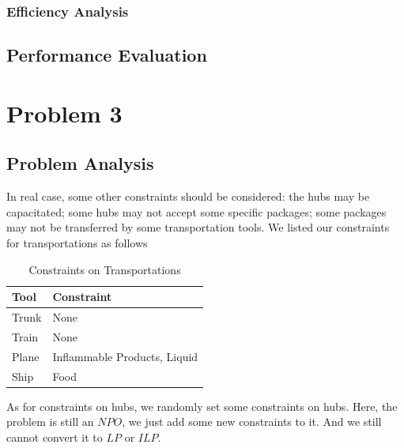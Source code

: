 \documentclass{llncs}
\begin{document}
\subsubsection{Efficiency Analysis}
\subsection{Performance Evaluation}

\section{Problem 3}
\subsection{Problem Analysis}
In real case, some other constraints should be considered: the hubs may be capacitated; some hubs may not accept some specific packages; some packages
may not be transferred by some transportation tools. We listed our constraints for transportations as follows \par
\begin{table}
  \caption{Constraints on Transportations}\label{cts1}
  \centering
  \begin{tabular}{|l|l|}
  \hline
  Tool &  Constraint \\
  \hline
  Trunk & None\\
  \hline
  Train & None\\
  \hline
  Plane & Inflammable Products, Liquid \\
  \hline
  Ship & Food \\
  \hline
  \end{tabular}
\end{table}
As for constraints on hubs, we randomly set some constraints on hubs. Here, the problem is still an $NPO$, we just add some new constraints to it.
And we still cannot convert it to $LP$ or $ILP$.
\end{document}

